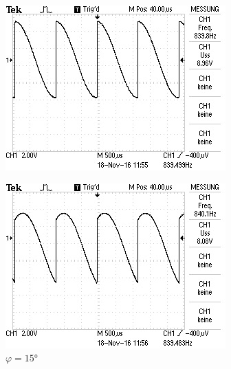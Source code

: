 \begin{figure}[!h]
\begin{minipage}[t]{0.3\textwidth}
\includegraphics[width=\textwidth]{Bilder/15.jpeg}
\label{fig:1}
\caption{$\varphi = 15\si{\degree}$}
\end{minipage}
\hspace{10pt}
\vspace{5pt}
\begin{minipage}[t]{0.3\textwidth}
\includegraphics[width=\textwidth]{Bilder/45.jpg}

\end{minipage}
\end{figure}
